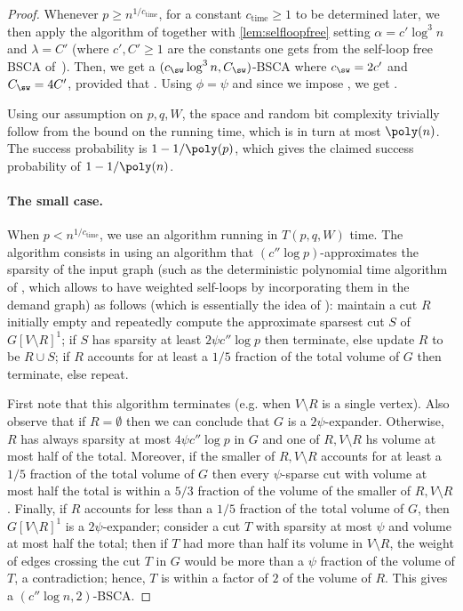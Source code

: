 \begin{proof}
Whenever $p \ge n^{1/c_{\text{time}}}$, for a constant $c_{\text{time}} \ge 1$ to be determined later, we then apply the algorithm of \cite{offlineexpdec,liexpdec} together with \cref{lem:selfloopfree} setting $\alpha=c' \log^3 n$ and $\lambda = C'$ (where $c',C'\ge 1$ are the constants one gets from the self-loop free BSCA of~\cite{offlineexpdec,liexpdec}). Then, we get a $(c_{\sw} \log^3 n,C_{\sw})$-BSCA where $c_{\sw}=2c'$ and $C_{\sw} = 4C'$, provided that . Using $\phi = \psi$ and since we impose , we get .

Using our assumption on $p,q,W$, the space and random bit complexity trivially follow from the bound on the running time, which is in turn at most $\poly(n)$. The success probability is $1-1/\poly(p)$, which gives the claimed success probability of $1-1/\poly(n)$.


\paragraph{The small case.}
When $p < n^{1/c_{\text{time}}}$, we use an algorithm running in $T(p,q,W)$ time. The algorithm consists in using an algorithm that $(c'' \log p)$-approximates the sparsity of the input graph (such as the deterministic polynomial time algorithm of \cite{leightonrao,llr}, which allows to have weighted self-loops by incorporating them in the demand graph) as follows (which is essentially the idea of \cite{offlineexpdec}): maintain a cut $R$ initially empty and repeatedly compute the approximate sparsest cut $S$ of $G[V\setminus R]^1$; if $S$ has sparsity at least $2\psi c'' \log p$ then terminate, else update $R$ to be $R \cup S$; if  $R$ accounts for at least a $1/5$ fraction of the total volume of $G$ then terminate, else repeat.

First note that this algorithm terminates (e.g. when $V \setminus R$ is a single vertex). Also observe that if $R = \emptyset$ then we can conclude that $G$ is a $2\psi$-expander. Otherwise, $R$ has always sparsity at most $4\psi c'' \log p$ in $G$ and one of $R,V\setminus R$ hs volume at most half of the total. Moreover, if the smaller of $R,V\setminus R$ accounts for at least a $1/5$ fraction of the total volume of $G$ then every $\psi$-sparse cut with volume at most half the total is within a $5/3$ fraction of the volume of the smaller of $R,V\setminus R$. Finally, if $R$ accounts for less than a $1/5$ fraction of the total volume of $G$, then $G[V\setminus R]^1$ is a $2\psi$-expander; consider a cut $T$ with sparsity at most $\psi$ and volume at most half the total; then if $T$ had more than half its volume in $V \setminus R$, the weight of edges crossing the cut $T$ in $G$ would be more than a $\psi$ fraction of the volume of $T$, a contradiction; hence, $T$ is within a factor of $2$ of the volume of $R$. This gives a $(c'' \log n,2)$-BSCA.


\end{proof}

